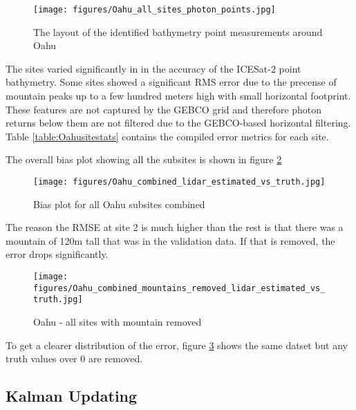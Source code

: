 \begin{figure}[h]
    \centering
    \texttt{[image: figures/Oahu\_all\_sites\_photon\_points.jpg]}
    \caption{The layout of the identified bathymetry point measurements around Oahu}
    \label{fig:oahu-all-photon-map}
\end{figure}

The sites varied significantly in in the accuracy of the ICESat-2 point bathymetry. Some sites showed a significant RMS error due to the precense of mountain peaks up to a few hundred meters high with small horizontal footprint. These features are not captured by the GEBCO grid and therefore photon returns below them are not filtered due to the GEBCO-based horizontal filtering. Table \ref{table:Oahusitestats} contains the compiled error metrics for each site.

 



The overall bias plot showing all the subsites is shown in figure \ref{fig:oahu-all-bias-plot}

\begin{figure}[h]
    \centering
    \texttt{[image: figures/Oahu\_combined\_lidar\_estimated\_vs\_truth.jpg]}
    \caption{Bias plot for all Oahu subsites combined}
    \label{fig:oahu-all-bias-plot}
\end{figure}

The reason the RMSE at site 2 is much higher than the rest is that there was a mountain of 120m tall that was in the validation data. If that is removed, the error drops significantly. 
\begin{figure}[h]
    \centering
    \texttt{[image: figures/Oahu\_combined\_mountains\_removed\_lidar\_estimated\_vs\_truth.jpg]}
    \caption{Oahu - all sites with mountain removed}
    \label{fig:oahu-bias-no-mountains}
\end{figure}

To get a clearer distribution of the error, figure \ref{fig:oahu-bias-no-mountains} shows the same datset but any truth values over 0 are removed.

\subsection{Kalman Updating}



